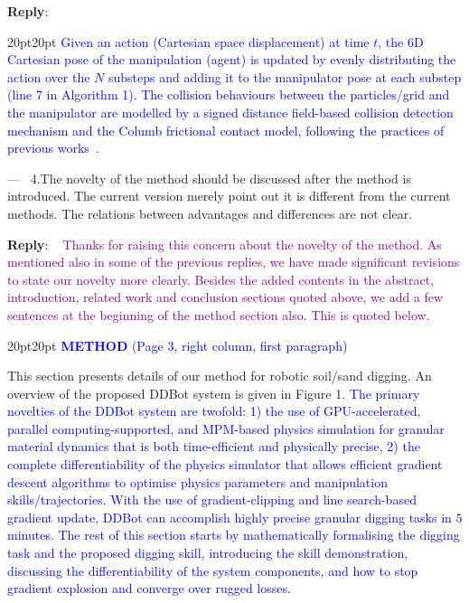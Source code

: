 \documentclass[11pt]{article}
\newcounter{reviewer}
\newcounter{point}[reviewer]
\renewcommand{\thepoint}{P\,\thereviewer.\arabic{point}}
\newenvironment{point}
   {\refstepcounter{point} \bigskip \noindent {\textbf{Reviewer~Point~\thepoint} } ---\ }
   {\par }
\newenvironment{reply}
   {\medskip \noindent \begin{sf}\textbf{Reply}: \  }
   {\medskip \end{sf}}
\newcommand{\rp}[1]{\textcolor{purple}{#1}}
\newcommand{\xt}[1]{\textcolor{blue}{#1}}
\begin{document}
\begin{reply}
\begin{adjustwidth}{20pt}{20pt}
\xt{Given an action (Cartesian space displacement) at time $t$, the 6D Cartesian pose of the manipulation (agent) is updated by evenly distributing the action over the $N$ substeps and adding it to the manipulator pose at each substep (line 7 in Algorithm 1). The collision behaviours between the particles/grid and the manipulator are modelled by a signed distance field-based collision detection mechanism and the Columb frictional contact model, following the practices of previous works~\cite{hu2018moving,xy2024sysid}.}

\end{adjustwidth}

\end{reply}

\begin{point}
4.The novelty of the method should be discussed after the method is
introduced. The current version merely point out it is different from
the current methods. The relations between advantages and differences
are not clear.
\end{point}

\begin{reply}
\rp{Thanks for raising this concern about the novelty of the method. As mentioned also in some of the previous replies, we have made significant revisions to state our novelty more clearly. Besides the added contents in the abstract, introduction, related work and conclusion sections quoted above, we add a few sentences at the beginning of the method section also. This is quoted below.}

\begin{adjustwidth}{20pt}{20pt}
\vspace{0.3cm}\noindent\xt{\textbf{METHOD} (Page 3, right column, first paragraph)}

This section presents details of our method for robotic soil/sand digging. An overview of the proposed DDBot system is given in Figure 1. \xt{The primary novelties of the DDBot system are twofold: 1) the use of GPU-accelerated, parallel computing-supported, and MPM-based physics simulation for granular material dynamics that is both time-efficient and physically precise, 2) the complete differentiability of the physics simulator that allows efficient gradient descent algorithms to optimise physics parameters and manipulation skills/trajectories. With the use of gradient-clipping and line search-based gradient update, DDBot can accomplish highly precise granular digging tasks in $5$ minutes. The rest of this section starts by mathematically formalising the digging task and the proposed digging skill, introducing the skill demonstration, discussing the differentiability of the system components, and how to stop gradient explosion and converge over rugged losses.}
\end{adjustwidth}

\end{reply}
\end{document}
